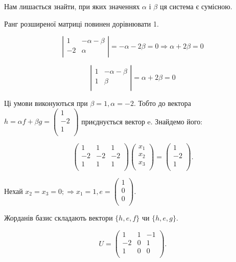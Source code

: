 Нам лишається знайти, при яких значеннях $\alpha$ і $\beta$ ця система є сумісною.

Ранг розширеної матриці повинен дорівнювати 1.

$$\left| \begin{matrix}
	1  & - \alpha - \beta \\
	-2 & \alpha \\
\end{matrix} \right| = -\alpha - 2\beta = 0 \Rightarrow \alpha + 2\beta = 0 $$

$$\left| \begin{matrix}
	1 & - \alpha - \beta \\
	1 & \beta \\
\end{matrix} \right| = \alpha + 2\beta = 0 $$

Ці умови виконуються при $\beta = 1, \alpha = -2 $. Тобто до вектора
$h = \alpha f + \beta g = \begin{pmatrix}
	1 \\
	-2 \\
	1 \\
\end{pmatrix}$
приєднується вектор e. Знайдемо його: 

$$\begin{pmatrix}
	1  & 1  & 1  \\
	-2 & -2 & -2 \\
	1  & 1  & 1  \\
\end{pmatrix} \begin{pmatrix}
	x_1 \\
	x_2 \\
	x_3 \\
\end{pmatrix} = \begin{pmatrix}
	1  \\
	-2 \\
	1  \\
\end{pmatrix}. $$

Нехай $x_2 = x_3 = 0; \Rightarrow x_1 = 1, e = \begin{pmatrix}
	1 \\
	0 \\
	0 \\
\end{pmatrix}$.

Жорданів базис складають вектори $\{h, e, f\}$ чи $\{h, e, g\}$.

$$U = \begin{pmatrix}
	1  & 1 & -1 \\
	-2 & 0 & 1 \\
	1  & 0 & 0 \\
\end{pmatrix}.$$

